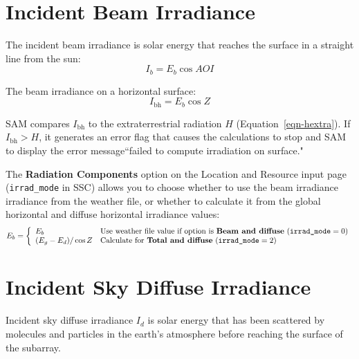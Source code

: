 \documentclass[12pt,letterpaper]{article}
\newcommand\AOI{\ensuremath{\mathit{AOI}}}
\begin{document}
\section{Incident Beam Irradiance}\label{sec-incidentbeam}

The incident beam irradiance is solar energy that reaches the surface in a straight line from the sun:
\begin{equation}
I_b = E_b\cos\AOI
\end{equation}

The beam irradiance on a horizontal surface:
\begin{equation}\label{eqn-hbeam}
I_{\mathrm{bh}}=E_b\cos Z
\end{equation}

SAM compares $I_{\mathrm{bh}}$ to the extraterrestrial radiation $H$ (Equation~\ref{eqn-hextra}). If $I_{\mathrm{bh}}>H$, it generates an error flag that causes the calculations to stop and SAM to display the error message``failed to compute irradiation on surface."

The \textbf{Radiation Components} option on the Location and Resource input page (\texttt{irrad\_mode} in SSC) allows you to choose whether to use the beam irradiance  irradiance from the weather file, or whether to calculate it from the global horizontal and diffuse horizontal irradiance values:
\begin{equation}\label{eqn-beam}
E_b = \left\{
\begin{array}{ll}
E_b & \text{Use weather file value if option is \textbf{Beam and diffuse} ($\texttt{irrad\_mode}=0)$}\\
(E_g - E_d)/\cos Z & \text{Calculate for \textbf{Total and diffuse} ($\texttt{irrad\_mode}=2)$}
\end{array}
\right.
\end{equation}

\section{Incident Sky Diffuse Irradiance}

Incident sky diffuse irradiance $I_d$ is solar energy that has been scattered by molecules and particles in the earth's atmosphere before reaching the surface of the subarray.
\end{document}
